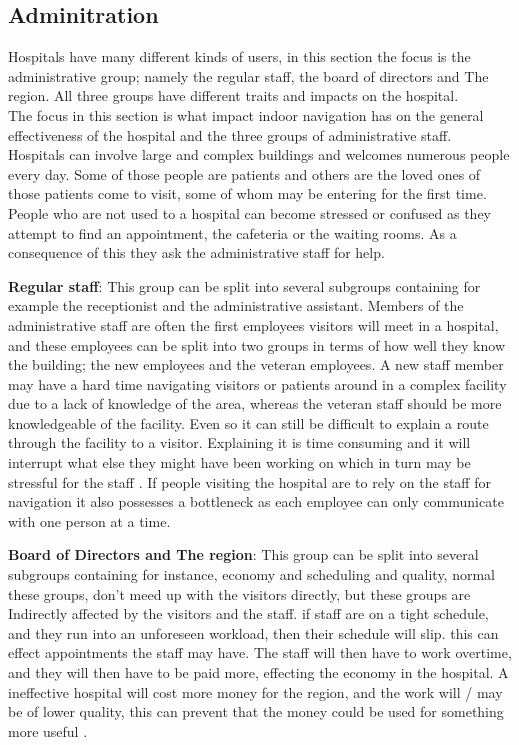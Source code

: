\subsection{Adminitration}

Hospitals have many different kinds of users, in this section the focus is the administrative group; namely the regular staff, the board of directors and The region. All three groups have different traits and impacts on the hospital. \\ The focus in this section is what impact indoor navigation has on the general effectiveness of the hospital and the three groups of administrative staff.\\
Hospitals can involve large and complex buildings \cite{wifi_navigation_ca} and welcomes numerous people every day. Some of those people are patients and others are the loved ones of those patients come to visit, some of whom may be entering for the first time. People who are not used to a hospital can become stressed or confused as they attempt to find an appointment, the cafeteria or the waiting rooms. As a consequence of this they ask the administrative staff for help. \cite{Frivillige_guider}

\textbf{Regular staff}: This group can be split into several subgroups containing for example the receptionist and the administrative assistant. Members of the administrative staff are often the first employees visitors will meet in a hospital, and these employees can be split into two groups in terms of how well they know the building; the new employees and the veteran employees. A new staff member may have a hard time navigating visitors or patients around in a complex facility due to a lack of knowledge of the area, whereas the veteran staff should be more knowledgeable of the facility. Even so it can still be difficult to explain a route through the facility to a visitor. Explaining it is time consuming and it will interrupt what else they might have been working on which in turn may be stressful for the staff \cite{arbejdsmiljo_ca}. If people visiting the hospital are to rely on the staff for navigation it also possesses a bottleneck as each employee can only communicate with one person at a time.

\textbf{Board of Directors and The region}: This group can be split into several subgroups containing for instance, economy and scheduling and quality, normal these groups, don't meed up with the visitors directly, but these groups are Indirectly affected by the visitors and the staff. if staff are on a tight schedule, and they run into an unforeseen workload, then their schedule will slip. this can effect appointments the staff may have. The staff will then have to work overtime, and they will then have to be paid more, effecting the economy in the hospital. A ineffective hospital will cost more money for the region, and the work will / may be of lower quality, this can prevent that the money could be used for something more useful \cite{timer_til_at_hjelpe_rundt}.

